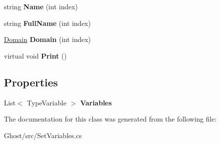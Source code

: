 \begin{DoxyCompactItemize}
\item 
\hypertarget{classghost_1_1SetVariables_3_01TypeVariable_01_4_adea50d515383d6c0252d36a164213d83}{string {\bfseries Name} (int index)}\label{classghost_1_1SetVariables_3_01TypeVariable_01_4_adea50d515383d6c0252d36a164213d83}

\item 
\hypertarget{classghost_1_1SetVariables_3_01TypeVariable_01_4_a7f32c243dd4c5b434c2b3d51c8b37e5e}{string {\bfseries Full\-Name} (int index)}\label{classghost_1_1SetVariables_3_01TypeVariable_01_4_a7f32c243dd4c5b434c2b3d51c8b37e5e}

\item 
\hypertarget{classghost_1_1SetVariables_3_01TypeVariable_01_4_ab9627fb96652fc476da1a0d04ebdc815}{\hyperlink{classghost_1_1Domain}{Domain} {\bfseries Domain} (int index)}\label{classghost_1_1SetVariables_3_01TypeVariable_01_4_ab9627fb96652fc476da1a0d04ebdc815}

\item 
\hypertarget{classghost_1_1SetVariables_3_01TypeVariable_01_4_ac254fd0d11c3effcaff7689d9954062b}{virtual void {\bfseries Print} ()}\label{classghost_1_1SetVariables_3_01TypeVariable_01_4_ac254fd0d11c3effcaff7689d9954062b}

\end{DoxyCompactItemize}
\subsection*{Properties}
\begin{DoxyCompactItemize}
\item 
\hypertarget{classghost_1_1SetVariables_3_01TypeVariable_01_4_a1aa6a24ebcf2782dbd09e186e5c000d8}{List$<$ Type\-Variable $>$ {\bfseries Variables}}\label{classghost_1_1SetVariables_3_01TypeVariable_01_4_a1aa6a24ebcf2782dbd09e186e5c000d8}

\end{DoxyCompactItemize}


The documentation for this class was generated from the following file\-:\begin{DoxyCompactItemize}
\item 
Ghost/src/Set\-Variables.\-cs\end{DoxyCompactItemize}

